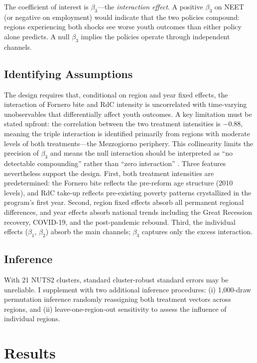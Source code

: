 \documentclass[12pt]{article}
\begin{document}
The coefficient of interest is $\beta_3$---the \emph{interaction effect}. A positive $\beta_3$ on NEET (or negative on employment) would indicate that the two policies compound: regions experiencing both shocks see worse youth outcomes than either policy alone predicts. A null $\beta_3$ implies the policies operate through independent channels.

\subsection{Identifying Assumptions}

The design requires that, conditional on region and year fixed effects, the interaction of Fornero bite and RdC intensity is uncorrelated with time-varying unobservables that differentially affect youth outcomes. A key limitation must be stated upfront: the correlation between the two treatment intensities is $-0.88$, meaning the triple interaction is identified primarily from regions with moderate levels of both treatments---the Mezzogiorno periphery. This collinearity limits the precision of $\beta_3$ and means the null interaction should be interpreted as ``no detectable compounding'' rather than ``zero interaction'' \citep{cameron2008}. Three features nevertheless support the design. First, both treatment intensities are predetermined: the Fornero bite reflects the pre-reform age structure (2010 levels), and RdC take-up reflects pre-existing poverty patterns crystallized in the program's first year. Second, region fixed effects absorb all permanent regional differences, and year effects absorb national trends including the Great Recession recovery, COVID-19, and the post-pandemic rebound. Third, the individual effects ($\beta_1$, $\beta_2$) absorb the main channels; $\beta_3$ captures only the excess interaction.

\subsection{Inference}

With 21 NUTS2 clusters, standard cluster-robust standard errors may be unreliable. I supplement with two additional inference procedures: (i) 1,000-draw permutation inference randomly reassigning both treatment vectors across regions, and (ii) leave-one-region-out sensitivity to assess the influence of individual regions.


\section{Results}
\label{sec:results}
\end{document}
